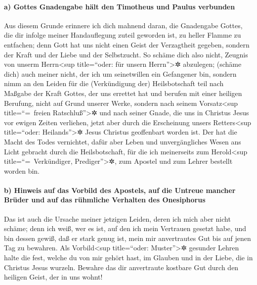 \hypertarget{a-gottes-gnadengabe-huxe4lt-den-timotheus-und-paulus-verbunden}{%
\paragraph{a) Gottes Gnadengabe hält den Timotheus und Paulus
verbunden}\label{a-gottes-gnadengabe-huxe4lt-den-timotheus-und-paulus-verbunden}}

 Aus diesem Grunde erinnere ich dich mahnend daran, die
Gnadengabe Gottes, die dir infolge meiner Handauflegung zuteil geworden
ist, zu heller Flamme zu entfachen;  denn Gott hat uns
nicht einen Geist der Verzagtheit gegeben, sondern der Kraft und der
Liebe und der Selbstzucht.  So schäme dich also nicht,
Zeugnis von unserm Herrn\textless sup title=``oder: für unsern
Herrn''\textgreater✲ abzulegen; (schäme dich) auch meiner nicht, der ich
um seinetwillen ein Gefangener bin, sondern nimm an den Leiden für die
(Verkündigung der) Heilsbotschaft teil nach Maßgabe der Kraft Gottes,
 der uns errettet hat und berufen mit einer heiligen
Berufung, nicht auf Grund unserer Werke, sondern nach seinem
Vorsatz\textless sup title=``=~freien Ratschluß''\textgreater✲ und nach
seiner Gnade, die uns in Christus Jesus vor ewigen Zeiten verliehen,
 jetzt aber durch die Erscheinung unsers
Retters\textless sup title=``oder: Heilands''\textgreater✲ Jesus
Christus geoffenbart worden ist. Der hat die Macht des Todes vernichtet,
dafür aber Leben und unvergängliches Wesen ans Licht gebracht durch die
Heilsbotschaft,  für die ich meinerseits zum
Herold\textless sup title=``=~Verkündiger, Prediger''\textgreater✲, zum
Apostel und zum Lehrer bestellt worden bin.

\hypertarget{b-hinweis-auf-das-vorbild-des-apostels-auf-die-untreue-mancher-bruxfcder-und-auf-das-ruxfchmliche-verhalten-des-onesiphorus}{%
\paragraph{b) Hinweis auf das Vorbild des Apostels, auf die Untreue
mancher Brüder und auf das rühmliche Verhalten des
Onesiphorus}\label{b-hinweis-auf-das-vorbild-des-apostels-auf-die-untreue-mancher-bruxfcder-und-auf-das-ruxfchmliche-verhalten-des-onesiphorus}}

 Das ist auch die Ursache meiner jetzigen Leiden, deren
ich mich aber nicht schäme; denn ich weiß, wer es ist, auf den ich mein
Vertrauen gesetzt habe, und bin dessen gewiß, daß er stark genug ist,
mein mir anvertrautes Gut bis auf jenen Tag zu bewahren. 
Als Vorbild\textless sup title=``oder: Muster''\textgreater✲ gesunder
Lehren halte die fest, welche du von mir gehört hast, im Glauben und in
der Liebe, die in Christus Jesus wurzeln.  Bewahre das
dir anvertraute kostbare Gut durch den heiligen Geist, der in uns wohnt!

